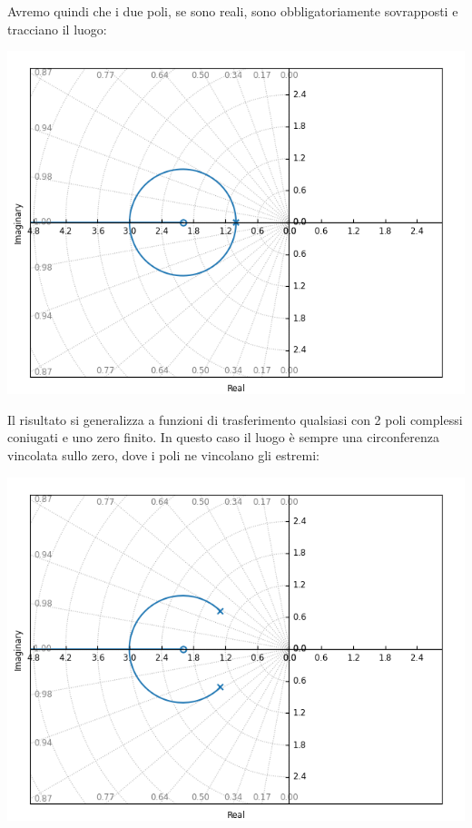 \documentclass[a4paper,11pt]{article}
\begin{document}
\begin{enumerate}
		Avremo quindi che i due poli, se sono reali, sono obbligatoriamente sovrapposti e tracciano il luogo:
	\begin{center}
		\includegraphics[scale=0.8]{../figures/rlocus/circ_full.png}
	\end{center}

	Il risultato si generalizza a funzioni di trasferimento qualsiasi con 2 poli complessi coniugati e uno zero finito.
	In questo caso il luogo è sempre una circonferenza vincolata sullo zero, dove i poli ne vincolano gli estremi:
	\begin{center}
		\includegraphics[scale=0.8]{../figures/rlocus/circ_cut.png}
	\end{center}


\end{enumerate}
\end{document}
